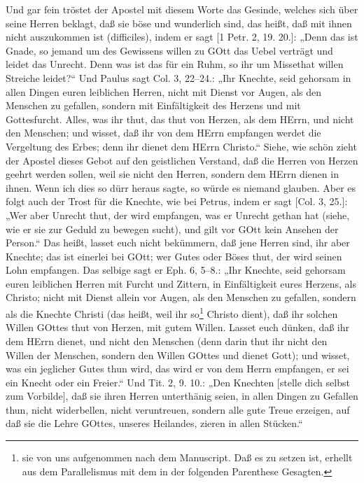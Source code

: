 Und gar fein tröstet der Apostel mit diesem Worte das Gesinde, welches sich über seine Herren beklagt, daß sie böse und wunderlich sind, das heißt, daß mit ihnen nicht auszukommen ist (difficiles), indem er sagt [1 Petr. 2, 19. 20.]: „Denn das ist Gnade, so jemand um des Gewissens willen zu GOtt das Uebel verträgt und leidet das Unrecht. Denn was ist das für ein Ruhm, so ihr um Missethat willen Streiche leidet?“ Und Paulus sagt Col. 3, 22–24.: „Ihr Knechte, seid gehorsam in allen Dingen euren leiblichen Herren, nicht mit Dienst vor Augen, als den Menschen zu gefallen, sondern mit Einfältigkeit des Herzens und mit Gottesfurcht. Alles, was ihr thut, das thut von Herzen, als dem HErrn, und nicht den Menschen; und wisset, daß ihr von dem HErrn empfangen werdet die Vergeltung des Erbes; denn ihr dienet dem HErrn Christo.“ Siehe, wie schön zieht der Apostel dieses Gebot auf den geistlichen Verstand, daß die Herren von Herzen geehrt werden sollen, weil sie nicht den Herren, sondern dem HErrn dienen in ihnen. Wenn ich dies so dürr heraus sagte, so würde es niemand glauben. Aber es folgt auch der Trost für die Knechte, wie bei Petrus, indem er sagt [Col. 3, 25.]: „Wer aber Unrecht thut, der wird empfangen, was er Unrecht gethan hat (siehe, wie er sie zur Geduld zu bewegen sucht), und gilt vor GOtt kein Ansehen der Person.“ Das heißt, lasset euch nicht bekümmern, daß jene Herren sind, ihr aber Knechte; das ist einerlei bei GOtt; wer Gutes oder Böses thut, der wird seinen Lohn empfangen. Das selbige sagt er Eph. 6, 5–8.: „Ihr Knechte, seid gehorsam euren leiblichen Herren mit Furcht und Zittern, in Einfältigkeit eures Herzens, als Christo; nicht mit Dienst allein vor Augen, als den Menschen zu gefallen, sondern als die Knechte Christi (das heißt, weil ihr so\footnote{sie von uns aufgenommen nach dem Manuscript. Daß es zu setzen ist, erhellt aus dem Parallelismus mit dem in der folgenden Parenthese Gesagten.} Christo dient), daß ihr solchen Willen GOttes thut von Herzen, mit gutem Willen. Lasset euch dünken, daß ihr dem HErrn dienet, und nicht den Menschen (denn darin thut ihr nicht den Willen der Menschen, sondern den Willen GOttes und dienet Gott); und wisset, was ein jeglicher Gutes thun wird, das wird er von dem Herrn empfangen, er sei ein Knecht oder ein Freier.“ Und Tit. 2, 9. 10.: „Den Knechten [stelle dich selbst zum Vorbilde], daß sie ihren Herren unterthänig seien, in allen Dingen zu Gefallen thun, nicht widerbellen, nicht veruntreuen, sondern alle gute Treue erzeigen, auf daß sie die Lehre GOttes, unseres Heilandes, zieren in allen Stücken.“

